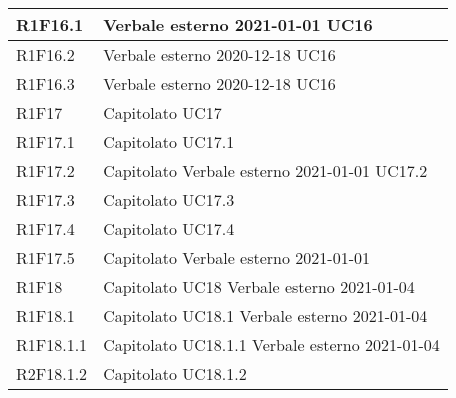\begin{center}
\begin{longtable}{|p{22mm}|p{22mm}|}
\\
\hline
R1F16.1 &
Verbale esterno 2021-01-01 \newline
UC16 \newline
\\
\hline
R1F16.2 &
Verbale esterno 2020-12-18 \newline
UC16 \newline
\\
\hline
R1F16.3 &
Verbale esterno 2020-12-18 \newline
UC16 \newline
\\
\hline
R1F17 &
Capitolato \newline
UC17 \newline
\\
\hline
R1F17.1 &
Capitolato \newline
UC17.1 \newline
\\
\hline
R1F17.2 &
Capitolato \newline
Verbale esterno 2021-01-01 \newline
UC17.2 \newline
\\
\hline
R1F17.3 &
Capitolato \newline
UC17.3 \newline
\\
\hline
R1F17.4 &
Capitolato \newline
UC17.4 \newline
\\
\hline
R1F17.5 &
Capitolato \newline
Verbale esterno 2021-01-01 \newline
\\
\hline
R1F18 &
Capitolato \newline
UC18 \newline
Verbale esterno 2021-01-04 \newline
\\
\hline
R1F18.1 &
Capitolato \newline
UC18.1 \newline
Verbale esterno 2021-01-04 \newline
\\
\hline
R1F18.1.1 &
Capitolato \newline
UC18.1.1 \newline
Verbale esterno 2021-01-04 \newline
\\
\hline
R2F18.1.2 &
Capitolato \newline
UC18.1.2 \newline

\end{longtable}
\end{center}
